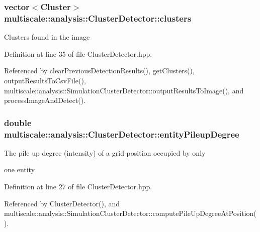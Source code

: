 \hypertarget{classmultiscale_1_1analysis_1_1ClusterDetector_aa81a8649bc743389c2fc1919d47eb5b3}{
\subsubsection[{clusters}]{\setlength{\rightskip}{0pt plus 5cm}vector$<${\bf Cluster}$>$ multiscale\-::analysis\-::\-Cluster\-Detector\-::clusters\hspace{0.3cm}{\ttfamily [protected]}}}\label{classmultiscale_1_1analysis_1_1ClusterDetector_aa81a8649bc743389c2fc1919d47eb5b3}
Clusters found in the image 

Definition at line 35 of file Cluster\-Detector.\-hpp.



Referenced by clear\-Previous\-Detection\-Results(), get\-Clusters(), output\-Results\-To\-Csv\-File(), multiscale\-::analysis\-::\-Simulation\-Cluster\-Detector\-::output\-Results\-To\-Image(), and process\-Image\-And\-Detect().

\hypertarget{classmultiscale_1_1analysis_1_1ClusterDetector_aaa93a4b3a5a3c4279aa434669093ac40}{
\subsubsection[{entity\-Pileup\-Degree}]{\setlength{\rightskip}{0pt plus 5cm}double multiscale\-::analysis\-::\-Cluster\-Detector\-::entity\-Pileup\-Degree\hspace{0.3cm}{\ttfamily [protected]}}}\label{classmultiscale_1_1analysis_1_1ClusterDetector_aaa93a4b3a5a3c4279aa434669093ac40}
\begin{DoxyVerb}      The pile up degree (intensity) of a grid position occupied by only
\end{DoxyVerb}
 one entity 

Definition at line 27 of file Cluster\-Detector.\-hpp.



Referenced by Cluster\-Detector(), and multiscale\-::analysis\-::\-Simulation\-Cluster\-Detector\-::compute\-Pile\-Up\-Degree\-At\-Position().

